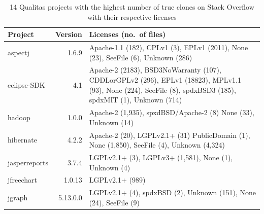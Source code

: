 \documentclass{sig-alternate-05-2015}
\begin{document}
\begin{table}
	\centering
	\caption{14 Qualitas projects with the highest number of true clones on Stack Overflow with their respective licenses}
	\label{t:q_projects_license}
	\small
	\begin{tabular}{l|r|p{4cm}}
		\hline 
		Project & Version & Licenses (no.~of files) \\
		\hline
		aspectj & 1.6.9 & Apache-1.1 (182), CPLv1 (3), \newline EPLv1 (2011), None (23), \newline SeeFile (6), Unknown (286) \\
		\hline
		eclipse-SDK &  4.1 & Apache-2 (2183), \newline BSD3NoWarranty (107), \newline CDDLorGPLv2 (296), \newline EPLv1 (18823), MPLv1.1 (93), \newline None (224), SeeFile (8), \newline spdxBSD3 (185), \newline spdxMIT (1), Unknown (714) \\
		\hline
		hadoop & 1.0.0 & Apache-2 (1,935), \newline spxdBSD/Apache-2 (8) \newline None (33), Unknown (14) \\
		\hline
		hibernate & 4.2.2 & Apache-2 (20), \newline LGPLv2.1+ (31) \newline PublicDomain (1), \newline None (1,850), SeeFile (4), \newline Unknown (4,324) \\
		\hline
		jasperreports & 3.7.4 & LGPLv2.1+ (3), \newline LGPLv3+ (1,581), \newline None (1), Unknown (4)\\
		\hline
		jfreechart & 1.0.13 & LGPLv2.1+ (989) \\
		\hline
		jgraph & 5.13.0.0 & LGPLv2.1+ (4), \newline spdxBSD (2), Unknown (151), \newline None (24), SeeFile (9) \\
		\hline

\end{tabular}
\end{table}
\end{document}
